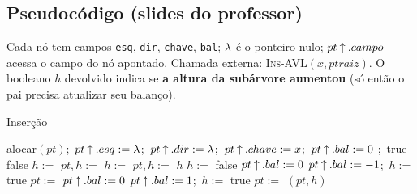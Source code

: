 \subsection{Pseudocódigo (slides do professor)}
Cada nó tem campos \texttt{esq}, \texttt{dir}, \texttt{chave}, \texttt{bal}; $\lambda$ é o ponteiro nulo; $pt\mathbin{\uparrow}.campo$ acessa o campo do nó apontado. Chamada externa: \textsc{Ins-AVL}$(x,ptraiz)$. O booleano $h$ devolvido indica se \textbf{a altura da subárvore aumentou} (só então o pai precisa atualizar seu balanço).

\begin{pseudo}{Inserção}
\begin{algorithmic}
  \State alocar$(pt)$;\ $pt\mathbin{\uparrow}.esq:=\lambda$;\ $pt\mathbin{\uparrow}.dir:=\lambda$;\ $pt\mathbin{\uparrow}.chave:=x$;\ $pt\mathbin{\uparrow}.bal:=0$
\EndProcedure
{} 
   \State {};\ \Return true \EndIf
   \State \Return false  \EndIf
    \State $h:=$ 
     \State $pt,h:=$  \EndIf
  \Else
    \State $h:=$ 
     \State $pt,h:=$  \EndIf
  \EndIf
  \State \Return $h$
\EndFunction
{}
  \State $h:=$ false
     \State $pt\mathbin{\uparrow}.bal:=0$
     \State $pt\mathbin{\uparrow}.bal:=-1$;\ $h:=$ true 
    \Else \State $pt:=$  
    \EndIf
  \Else
     \State $pt\mathbin{\uparrow}.bal:=0$
     \State $pt\mathbin{\uparrow}.bal:=1$;\ $h:=$ true
    \Else \State $pt:=$ 
    \EndIf
  \EndIf
  \State \Return $(pt,h)$ 
\EndFunction
\end{algorithmic}
\end{pseudo}


